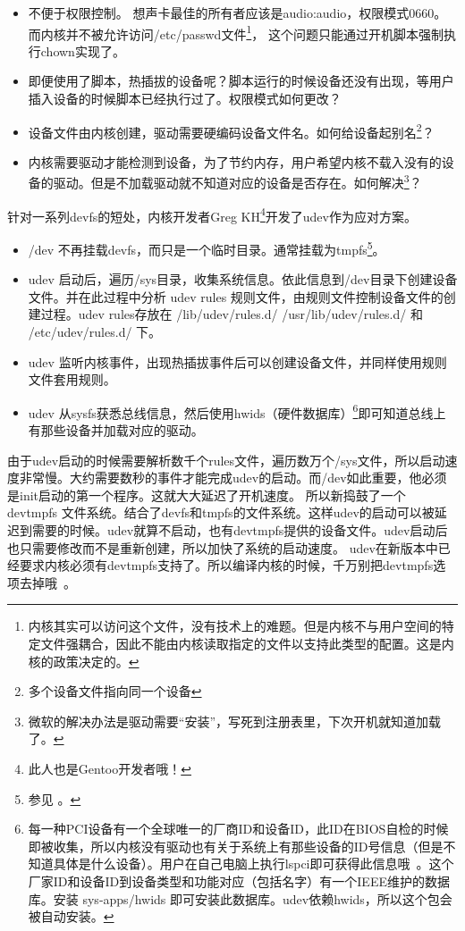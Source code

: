 \begin{itemize}
\item 不便于权限控制。
想声卡最佳的所有者应该是audio:audio，权限模式0660。
而内核并不被允许访问/etc/passwd文件\footnote{内核其实可以访问这个文件，没有技术上的难题。但是内核不与用户空间的特定文件强耦合，因此不能由内核读取指定的文件以支持此类型的配置。这是内核的政策决定的。}，
这个问题只能通过开机脚本强制执行chown实现了。
\item 即便使用了脚本，热插拔的设备呢？脚本运行的时候设备还没有出现，等用户插入设备的时候脚本已经执行过了。权限模式如何更改？
\item 设备文件由内核创建，驱动需要硬编码设备文件名。如何给设备起别名\footnote{多个设备文件指向同一个设备}？
\item 内核需要驱动才能检测到设备，为了节约内存，用户希望内核不载入没有的设备的驱动。但是不加载驱动就不知道对应的设备是否存在。如何解决\footnote{微软的解决办法是驱动需要“安装”，写死到注册表里，下次开机就知道加载了。}？
\end{itemize}

针对一系列devfs的短处，内核开发者Greg KH\footnote{此人也是Gentoo开发者哦！}开发了udev作为应对方案。

\begin{itemize}
\item /dev 不再挂载devfs，而只是一个临时目录。通常挂载为tmpfs\footnote{参见 。}。
\item udev 启动后，遍历/sys目录，收集系统信息。依此信息到/dev目录下创建设备文件。并在此过程中分析 udev rules 规则文件，由规则文件控制设备文件的创建过程。udev rules存放在 /lib/udev/rules.d/ /usr/lib/udev/rules.d/ 和 /etc/udev/rules.d/ 下。
\item udev 监听内核事件，出现热插拔事件后可以创建设备文件，并同样使用规则文件套用规则。
\item udev 从sysfs获悉总线信息，然后使用hwids（硬件数据库）\footnote{每一种PCI设备有一个全球唯一的厂商ID和设备ID，此ID在BIOS自检的时候即被收集，所以内核没有驱动也有关于系统上有那些设备的ID号信息（但是不知道具体是什么设备）。用户在自己电脑上执行lspci即可获得此信息哦~。这个厂家ID和设备ID到设备类型和功能对应（包括名字）有一个IEEE维护的数据库。安装 sys-apps/hwids 即可安装此数据库。udev依赖hwids，所以这个包会被自动安装。}即可知道总线上有那些设备并加载对应的驱动。
\end{itemize}

由于udev启动的时候需要解析数千个rules文件，遍历数万个/sys文件，所以启动速度非常慢。大约需要数秒的事件才能完成udev的启动。而/dev如此重要，他必须是init启动的第一个程序。这就大大延迟了开机速度。
所以新捣鼓了一个 devtmpfs 文件系统。结合了devfs和tmpfs的文件系统。这样udev的启动可以被延迟到需要的时候。udev就算不启动，也有devtmpfs提供的设备文件。udev启动后也只需要修改而不是重新创建，所以加快了系统的启动速度。
udev在新版本中已经要求内核必须有devtmpfs支持了。所以编译内核的时候，千万别把devtmpfs选项去掉哦~。

